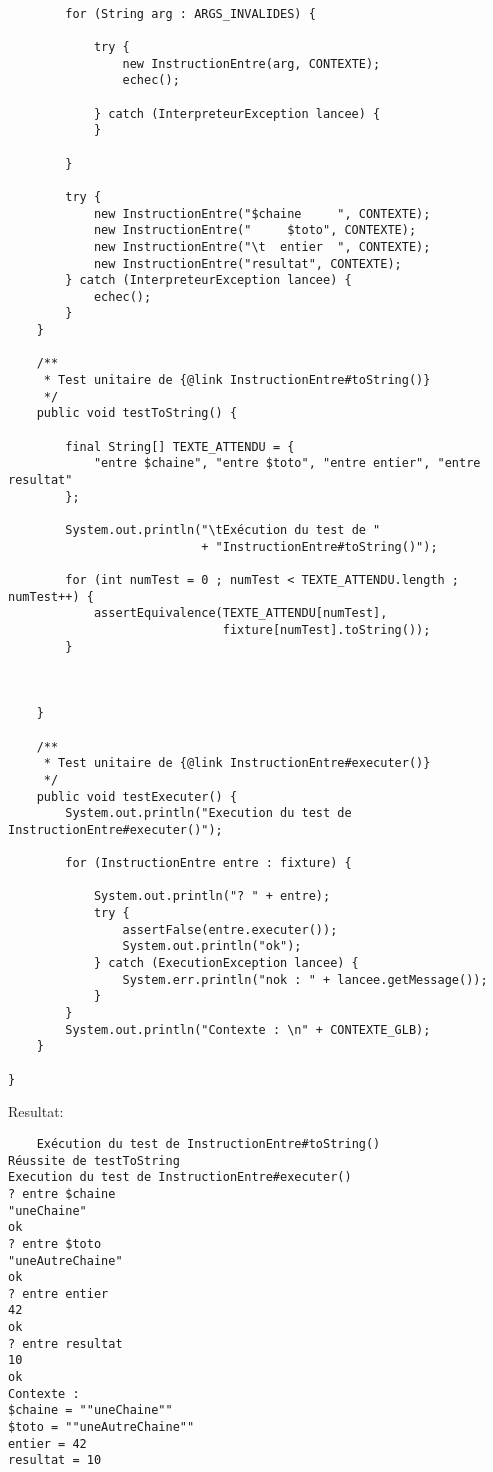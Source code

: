 \begin{enum}
\begin{verbatim}
        
        for (String arg : ARGS_INVALIDES) {
            
            try {
                new InstructionEntre(arg, CONTEXTE);
                echec();
                
            } catch (InterpreteurException lancee) {
            }
            
        }
        
        try {
            new InstructionEntre("$chaine     ", CONTEXTE);
            new InstructionEntre("     $toto", CONTEXTE);
            new InstructionEntre("\t  entier  ", CONTEXTE);
            new InstructionEntre("resultat", CONTEXTE);
        } catch (InterpreteurException lancee) {
            echec();
        }
    }
    
    /**
     * Test unitaire de {@link InstructionEntre#toString()}
     */
    public void testToString() {
        
        final String[] TEXTE_ATTENDU = { 
            "entre $chaine", "entre $toto", "entre entier", "entre resultat"
        };
        
        System.out.println("\tExécution du test de "
                           + "InstructionEntre#toString()");
        
        for (int numTest = 0 ; numTest < TEXTE_ATTENDU.length ; numTest++) {
            assertEquivalence(TEXTE_ATTENDU[numTest],
                              fixture[numTest].toString());
        }
        
        
        
    }
    
    /**
     * Test unitaire de {@link InstructionEntre#executer()}
     */
    public void testExecuter() {
        System.out.println("Execution du test de InstructionEntre#executer()");
        
        for (InstructionEntre entre : fixture) {
            
            System.out.println("? " + entre);
            try {
                assertFalse(entre.executer());
                System.out.println("ok");
            } catch (ExecutionException lancee) {
                System.err.println("nok : " + lancee.getMessage());
            }
        }
        System.out.println("Contexte : \n" + CONTEXTE_GLB);
    }
    
}
\end{verbatim}
Resultat:
\begin{verbatim}
    Exécution du test de InstructionEntre#toString()
Réussite de testToString
Execution du test de InstructionEntre#executer()
? entre $chaine
"uneChaine"
ok
? entre $toto
"uneAutreChaine"
ok
? entre entier
42
ok
? entre resultat
10
ok
Contexte : 
$chaine = ""uneChaine""
$toto = ""uneAutreChaine""
entier = 42
resultat = 10


\end{verbatim}
\end{enum}
